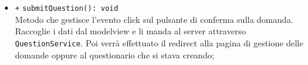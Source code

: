 \begin{itemize}
\begin{itemize}
\begin{itemize}
		\end{itemize}
		\item \texttt{+} \texttt{submitQuestion(): void}\\ 
		Metodo che gestisce l’evento click sul pulsante di conferma sulla domanda. Raccoglie i dati dal modelview e li manda al server attraverso \texttt{QuestionService}. Poi verrà effettuato il redirect alla pagina di gestione delle domande oppure al questionario che si stava creando; 
	\end{itemize}
\end{itemize}

